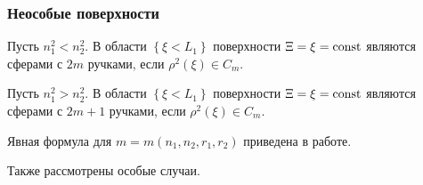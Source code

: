 \begin{frame}\frametitle{Неособые поверхности}
\begin{mytheorem}
Пусть $n_1^2<n_2^2$. В области $\left\{\xi < L_1\right\}$ поверхности $\Xi = \xi =  \mathrm{const}$ являются сферами с $2m$ ручками, если $\rho^2(\xi) \in C_m$.
\end{mytheorem}

\begin{mytheorem}
Пусть $n_1^2>n_2^2$. В области $\left\{\xi < L_1\right\}$ поверхности $\Xi = \xi =  \mathrm{const}$ являются сферами с $2m+1$ ручками, если $\rho^2(\xi) \in C_m$.
\end{mytheorem}

\vspace{15pt}
Явная формула для $m = m(n_1, n_2, r_1, r_2)$ приведена в работе.

Также рассмотрены особые случаи.
\end{frame}


%
%
%
%
%
%

